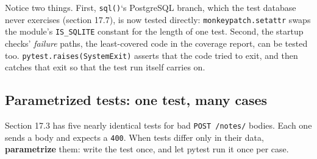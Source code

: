 \begin{codebox}
\begin{Shaded}
\begin{Highlighting}[]
\OperatorTok{=} 
    \OperatorTok{==}\NormalTok{ (}
\NormalTok{    )}


\NormalTok{, }\NormalTok{)}
    \NormalTok{) }
    \OperatorTok{==} 
\end{Highlighting}
\end{Shaded}

\end{codebox}

\noindent{}Notice two things. First, \texttt{sql()}`s PostgreSQL branch, which the test database never exercises (section 17.7), is now tested directly: \texttt{monkeypatch.setattr} swaps the module's \texttt{IS\_SQLITE} constant for the length of one test. Second, the startup checks' \emph{failure} paths, the least-covered code in the coverage report, can be tested too. \texttt{pytest.}\allowbreak{}\texttt{raises(SystemExit)} asserts that the code tried to exit, and then catches that exit so that the test run itself carries on.

\subsection*{Parametrized tests: one test, many cases}\label{17-build-process:parametrized-tests-one-test-many-cases}

Section 17.3 has five nearly identical tests for bad \texttt{POST\ /notes/} bodies. Each one sends a body and expects a \texttt{400}. When tests differ only in their data, \textbf{parametrize} them: write the test once, and let pytest run it once per case.

